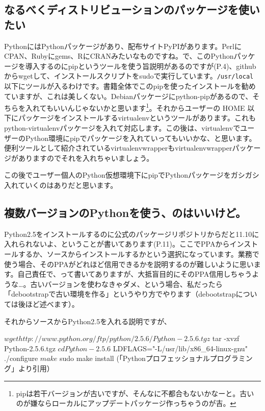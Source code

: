 \documentclass[mingoth,a4paper]{jsarticle}
\begin{document}
\subsection{なるべくディストリビューションのパッケージを使いたい}

PythonにはPythonパッケージがあり、配布サイトPyPIがあります。PerlにCPAN、Rubyにgems、RにCRANみたいなものですね。で、このPythonパッケージを導入するのにpipというツールを使う旨説明があるのですが(P.4)、githubからwgetして、インストールスクリプトをsudoで実行しています。\verb!/usr/local! 以下にツールが入るわけです。書籍全体でこのpipを使ったインストールを勧めていますが、これは美しくない。Debianパッケージにpython-pipがあるので、そちらを入れてもいいんじゃないかと思います\footnote{pipは若干バージョンが古いですが、そんなに不都合もないかなーと。古いのが嫌ならローカルにアップデートパッケージ作っちゃうのが吉。}。それからユーザーの HOME 以下にパッケージをインストールするvirtualenvというツールがあります。これもpython-virtualenvパッケージを入れて対応します。この後は、virtualenvでユーザーのPython環境にpipでパッケージを入れていってもいいかな、と思います。便利ツールとして紹介されているvirtualenvwrapperもvirtualenvwrapperパッケージがありますのでそれを入れちゃいましょう。


この後でユーザー個人のPython仮想環境下にpipでPythonパッケージをガシガシ入れていくのはありだと思います。


\subsection{複数バージョンのPythonを使う、のはいいけど。}

Python2.5をインストールするのに公式のパッケージリポジトリからだと11.10に入れられないよ、ということが書いてあります(P.11)。ここでPPAからインストールするか、ソースからインストールするかという選択になっています。業務で使う場合、そのPPAがどれほど信用できるかを説明するのが難しいように思います。自己責任で、って書いてありますが、大抵盲目的にそのPPA信用しちゃうような…。古いバージョンを使わなきゃダメ、という場合、私だったら「debootstrapで古い環境を作る」というやり方でやります（debootstrapについては後ほど述べます）。


それからソースからPython2.5を入れる説明ですが、

\begin{commandline}
$ wget http://www.python.org/ftp/python/2.5.6/Python-2.5.6.tgz
$ tar -xvzf Python-2.5.6.tgz
$ cd Python-2.5.6
$ LDFLAGS="-L/usr/lib/x86_64-linux-gnu" ./configure
$ make
$ sudo make install
(「Pythonプロフェッショナルプログラミング」より引用）
\end{commandline}
\end{document}

